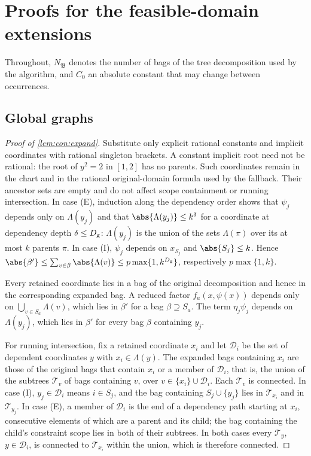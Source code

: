 \section{Proofs for the feasible-domain extensions}\label{app:con}

Throughout, $N_{\mathfrak B}$ denotes the number of bags of the tree
decomposition used by the algorithm, and $C_0$ an absolute constant that may
change between occurrences.

\subsection{Global graphs}\label{app:con:graph}

\begin{proof}[Proof of \cref{lem:con:expand}]
Substitute only explicit rational constants and implicit coordinates with
rational singleton brackets. A constant
implicit root need not be rational: the root of $y^2=2$ in $[1,2]$ has no
parents. Such coordinates remain in the chart and in the rational
original-domain formula used by the fallback. Their ancestor sets are empty
and do not affect scope containment or running intersection. In case (E),
induction along the dependency order shows that $\psi_j$ depends only on
$\Lambda(y_j)$ and that $\abs{\Lambda(y_j)}\le k^\delta$ for a coordinate at
dependency depth $\delta\le D_{\rm g}$: $\Lambda(y_j)$ is the union of the sets
$\Lambda(\pi)$ over its at most $k$ parents $\pi$. In case (I), $\psi_j$
depends on $x_{S_j}$ and $\abs{S_j}\le k$. Hence
$\abs{\beta'}\le\sum_{v\in\beta}\abs{\Lambda(v)}\le p\max\{1,k^{D_{\rm g}}\}$,
respectively $p\max\{1,k\}$.

Every retained coordinate lies in a bag of the original decomposition and
hence in the corresponding expanded bag. A reduced factor $f_a(x,\psi(x))$
depends only on $\bigcup_{v\in S_a}\Lambda(v)$, which lies in $\beta'$ for a
bag $\beta\supseteq S_a$. The term $\eta_j\psi_j$ depends on $\Lambda(y_j)$,
which lies in $\beta'$ for every bag $\beta$ containing $y_j$.

For running intersection, fix a retained coordinate $x_i$ and let $\mathcal
D_i$ be the set of dependent coordinates $y$ with $x_i\in\Lambda(y)$. The
expanded bags containing $x_i$ are those of the original bags that contain
$x_i$ or a member of $\mathcal D_i$, that is, the union of the subtrees
$\mathcal T_v$ of bags containing $v$, over $v\in\{x_i\}\cup\mathcal D_i$.
Each $\mathcal T_v$ is connected. In case (I), $y_j\in\mathcal D_i$ means
$i\in S_j$, and the bag containing $S_j\cup\{y_j\}$ lies in $\mathcal T_{x_i}$
and in $\mathcal T_{y_j}$. In case (E), a member of $\mathcal D_i$ is the end
of a dependency path starting at $x_i$, consecutive elements of which are a
parent and its child; the bag containing the child's constraint scope lies in
both of their subtrees. In both cases every $\mathcal T_y$, $y\in\mathcal D_i$,
is connected to $\mathcal T_{x_i}$ within the union, which is therefore
connected.
\end{proof}

